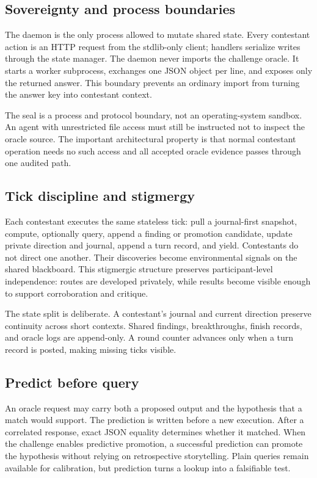 \documentclass[11pt]{article}
\begin{document}
\subsection{Sovereignty and process boundaries}

The daemon is the only process allowed to mutate shared state.  Every
contestant action is an HTTP request from the stdlib-only client; handlers
serialize writes through the state manager.  The daemon never imports the
challenge oracle.  It starts a worker subprocess, exchanges one JSON object
per line, and exposes only the returned answer.  This boundary prevents an
ordinary import from turning the answer key into contestant context.

The seal is a process and protocol boundary, not an operating-system sandbox.
An agent with unrestricted file access must still be instructed not to inspect
the oracle source.  The important architectural property is that normal
contestant operation needs no such access and all accepted oracle evidence
passes through one audited path.

\subsection{Tick discipline and stigmergy}

Each contestant executes the same stateless tick: pull a journal-first
snapshot, compute, optionally query, append a finding or promotion candidate,
update private direction and journal, append a turn record, and yield.
Contestants do not direct one another.  Their discoveries become environmental
signals on the shared blackboard.  This stigmergic structure preserves
participant-level independence: routes are developed privately, while
results become visible enough to support corroboration and critique.

The state split is deliberate.  A contestant's journal and current direction
preserve continuity across short contexts.  Shared findings,
breakthroughs, finish records, and oracle logs are append-only.  A round
counter advances only when a turn record is posted, making missing ticks
visible.

\subsection{Predict before query}

An oracle request may carry both a proposed output and the hypothesis that a
match would support.  The prediction is written before a new execution.
After a correlated response, exact JSON equality determines whether it
matched.  When the challenge enables predictive promotion, a successful
prediction can promote the hypothesis without relying on retrospective
storytelling.  Plain queries remain available for calibration, but prediction
turns a lookup into a falsifiable test.
\end{document}
